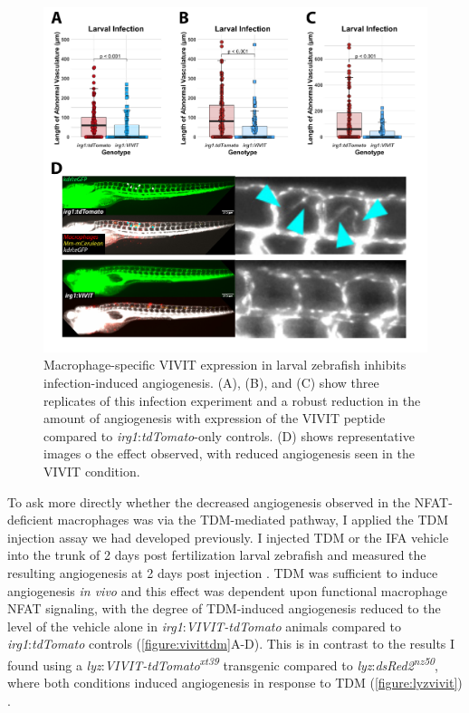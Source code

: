 \begin{figure}
\centering
\includegraphics[width=\textwidth]{images/vivitlinf.pdf}
\caption[\textit{irg1}:\textit{VIVIT\hyp{}tdTomato} inhibits angiogenesis during infection]{Macrophage\hyp{}specific VIVIT expression in larval zebrafish inhibits infection\hyp{}induced angiogenesis. (A), (B), and (C) show three replicates of this infection experiment and a robust reduction in the amount of angiogenesis with expression of the VIVIT peptide compared to \textit{irg1}:\textit{tdTomato}\hyp{}only controls. (D) shows representative images o the effect observed, with reduced angiogenesis seen in the VIVIT condition.}
\label{figure:vivitinf}
\end{figure}

To ask more directly whether the decreased angiogenesis observed in the NFAT\hyp{}deficient macrophages was via the TDM\hyp{}mediated pathway, I applied the TDM injection assay we had developed previously. I injected TDM or the IFA vehicle into the trunk of 2 days post fertilization larval zebrafish and measured the resulting angiogenesis at 2 days post injection \citep{Walton2018}. TDM was sufficient to induce angiogenesis \textit{in vivo} and this effect was dependent upon functional macrophage NFAT signaling, with the degree of TDM\hyp{}induced angiogenesis reduced to the level of the vehicle alone in \textit{irg1}:\textit{VIVIT\hyp{}tdTomato} animals compared to \textit{irg1}:\textit{tdTomato} controls (\autoref{figure:vivittdm}A\hyp{}D). This is in contrast to the results I found using a \textit{lyz}:\textit{VIVIT\hyp{}tdTomato\textsuperscript{xt39}} transgenic compared to \textit{lyz}:\textit{dsRed2\textsuperscript{nz50}}, where both conditions induced angiogenesis in response to TDM (\autoref{figure:lyzvivit}) \citep{Hall2007}.

